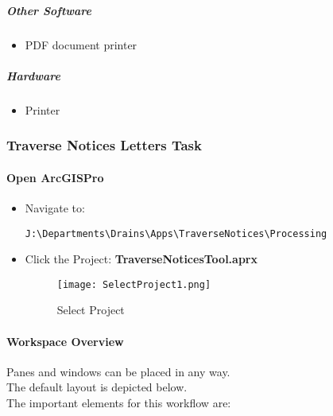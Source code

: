 \subparagraph{Other Software}

\begin{itemize}

\item PDF document printer

\end{itemize}

\subparagraph{Hardware}

\begin{itemize}

\item Printer

\end{itemize}

\clearpage


\subsubsection{Traverse Notices Letters Task}


\paragraph{Open ArcGISPro}

\begin{itemize}

\item Navigate to: \begin{verbatim}J:\Departments\Drains\Apps\TraverseNotices\Processing\end{verbatim}

\item Click the Project: \textbf{TraverseNoticesTool.aprx}
\begin{figure}[h!]
 \centering
     \texttt{[image: SelectProject1.png]}
 \caption{Select Project}
 \end{figure}

\end{itemize}
\clearpage

\paragraph{Workspace Overview}

\noindent Panes and windows can be placed in any way.\\
\noindent The default layout is depicted below. \\ 
\noindent The important elements for this workflow are:

